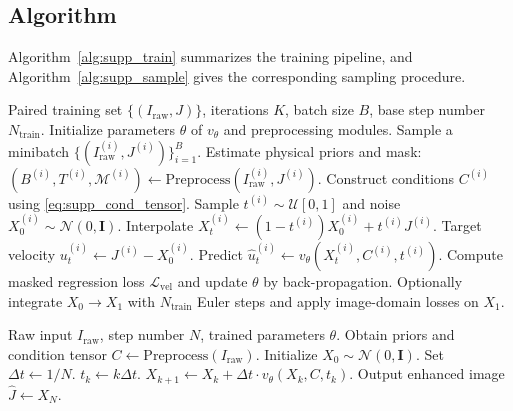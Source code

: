 \documentclass[runningheads]{llncs}
\begin{document}
\subsection{Algorithm}
Algorithm~\ref{alg:supp_train} summarizes the training pipeline, and Algorithm~\ref{alg:supp_sample} gives the corresponding sampling procedure.

\begin{algorithm}[H]
\caption{Conditional Rectified Flow Training (RF-MCUIE)}
\label{alg:supp_train}
\begin{algorithmic}[1]
\REQUIRE Paired training set $\{(I_{\mathrm{raw}},J)\}$, iterations $K$, batch size $B$, base step number $N_{\mathrm{train}}$.
\STATE Initialize parameters $\theta$ of $v_\theta$ and preprocessing modules.
    \STATE Sample a minibatch $\{(I_{\mathrm{raw}}^{(i)},J^{(i)})\}_{i=1}^{B}$.
    \STATE Estimate physical priors and mask: $(B^{(i)},T^{(i)},\mathcal{M}^{(i)})\leftarrow \mathrm{Preprocess}(I_{\mathrm{raw}}^{(i)},J^{(i)})$.
    \STATE Construct conditions $C^{(i)}$ using \eqref{eq:supp_cond_tensor}.
    \STATE Sample $t^{(i)}\sim \mathcal{U}[0,1]$ and noise $X_0^{(i)}\sim \mathcal{N}(0,\mathbf{I})$.
    \STATE Interpolate $X_t^{(i)} \leftarrow (1-t^{(i)})X_0^{(i)} + t^{(i)}J^{(i)}$.
    \STATE Target velocity $u_t^{(i)}\leftarrow J^{(i)}-X_0^{(i)}$.
    \STATE Predict $\widehat{u}_t^{(i)} \leftarrow v_\theta(X_t^{(i)}, C^{(i)}, t^{(i)})$.
    \STATE Compute masked regression loss $\mathcal{L}_{\mathrm{vel}}$ and update $\theta$ by back-propagation.
        \STATE Optionally integrate $X_0\rightarrow X_1$ with $N_{\mathrm{train}}$ Euler steps and apply image-domain losses on $X_1$.
    \ENDIF
\ENDFOR
\end{algorithmic}
\end{algorithm}

\begin{algorithm}[H]
\caption{Conditional Rectified Flow Sampling (Euler Integration)}
\label{alg:supp_sample}
\begin{algorithmic}[1]
\REQUIRE Raw input $I_{\mathrm{raw}}$, step number $N$, trained parameters $\theta$.
\STATE Obtain priors and condition tensor $C\leftarrow \mathrm{Preprocess}(I_{\mathrm{raw}})$.
\STATE Initialize $X_0\sim\mathcal{N}(0,\mathbf{I})$.
\STATE Set $\Delta t \leftarrow 1/N$.
    \STATE $t_k \leftarrow k\Delta t$.
    \STATE $X_{k+1} \leftarrow X_k + \Delta t\cdot v_\theta(X_k,C,t_k)$.
\ENDFOR
\STATE Output enhanced image $\widehat{J}\leftarrow X_N$.
\end{algorithmic}
\end{algorithm}
\end{document}

